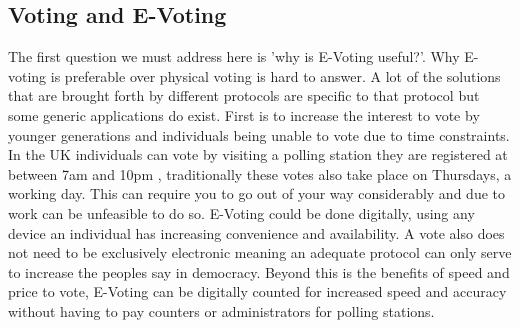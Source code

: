 \documentclass{entcs}
\begin{document}
\subsection{Voting and E-Voting}
The first question we must address here is 'why is E-Voting useful?'. Why E-voting is preferable over physical voting is hard to answer. A lot of the solutions that are brought forth by different protocols are specific to that protocol but some generic applications do exist. First is to increase the interest to vote by younger generations and individuals being unable to vote due to time constraints. In the UK individuals can vote by visiting a polling station they are registered at between 7am and 10pm \cite{pollStations}, traditionally these votes also take place on Thursdays, a working day. This can require you to go out of your way considerably and due to work can be unfeasible to do so. E-Voting could be done digitally, using any device an individual has increasing convenience and availability. A vote also does not need to be exclusively electronic meaning an adequate protocol can only serve to increase the peoples say in democracy. Beyond this is the benefits of speed and price to vote, E-Voting can be digitally counted for increased speed and accuracy without having to pay counters or administrators for polling stations.
\end{document}

